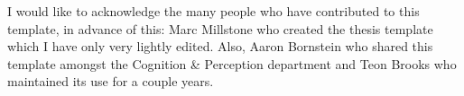 
I would like to acknowledge the many people who have contributed to this template, in advance of this: Marc Millstone who created the thesis template which I have only very lightly edited.
Also, Aaron Bornstein who shared this template amongst the Cognition \& Perception department and Teon Brooks who maintained its use for a couple years.
